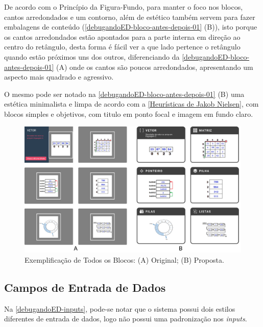 De acordo com o Princípio da Figura-Fundo, para manter o foco nos blocos, cantos arredondados e um contorno, além de estético também servem para fazer embalagens de conteúdo (\autoref{debugandoED-bloco-antes-depois-01} (B)), isto porque os cantos arredondados estão apontados para a parte interna em direção ao centro do retângulo, desta forma é fácil ver a que lado pertence o retângulo quando estão próximos uns dos outros, diferenciando da \autoref{debugandoED-bloco-antes-depois-01} (A) onde os cantos são poucos arredondados, apresentando um aspecto mais quadrado e agressivo.

O mesmo pode ser notado na \autoref{debugandoED-bloco-antes-depois-01} (B) uma estética minimalista e limpa de acordo com a \autoref{Heurísticas de Jakob Nielsen}, com blocos simples e objetivos, com titulo em ponto focal e imagem em fundo claro.

\begin{figure}[htb]
    \begin{center}
	    \includegraphics[scale=0.25]{figs/debugandoED-bloco-antes-depois-01.png}
	\end{center}
    \caption{\label{debugandoED-bloco-antes-depois-01}Exemplificação de Todos os Blocos: (A) Original; (B) Proposta.}
\end{figure}


\subsection{Campos de Entrada de Dados}
\label{Campos_de_Entrada_de_Dados}

Na \autoref{debugandoED-inputs}, pode-se notar que o sistema possui dois estilos diferentes de entrada de dados, logo não possui uma padronização nos \textit{inputs}.

